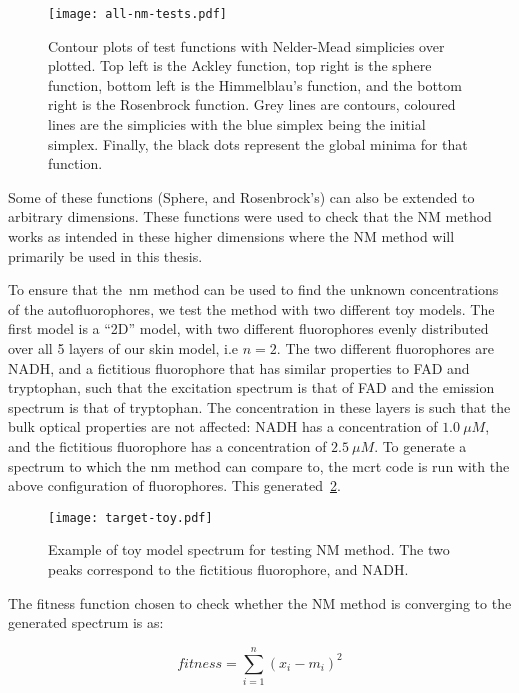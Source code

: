 \begin{figure}[!htbp]
    \centering
    \texttt{[image: all-nm-tests.pdf]}
    \caption{Contour plots of test functions with Nelder-Mead simplicies over plotted. Top left is the Ackley function, top right is the sphere function, bottom left is the Himmelblau's function, and the bottom right is the Rosenbrock function. Grey lines are contours, coloured lines are the simplicies with the blue simplex being the initial simplex. Finally, the black dots represent the global minima for that function.}
    \label{fig:nmtest}
\end{figure}

Some of these functions (Sphere, and Rosenbrock's) can also be extended to arbitrary dimensions. These functions were used to check that the NM method works as intended in these higher dimensions where the NM method will primarily be used in this thesis.

To ensure that the~\gls*{nm} method can be used to find the unknown concentrations of the autofluorophores, we test the method with two different toy models.
The first model is a ``2D'' model, with two different fluorophores evenly distributed over all 5 layers of our skin model, i.e $n=2$. 
The two different fluorophores are NADH, and a fictitious fluorophore that has similar properties to FAD and tryptophan, such that the excitation spectrum is that of FAD and the emission spectrum is that of tryptophan.
The concentration in these layers is such that the bulk optical properties are not affected: NADH has a concentration of $1.0~\mu M$, and the fictitious fluorophore has a concentration of $2.5~\mu M$.
To generate a spectrum to which the \gls*{nm} method can compare to, the \gls*{mcrt} code is run with the above configuration of fluorophores.
This generated~\cref{fig:toymodelspectra}.


\begin{figure}[!htbp]
  \centering
  \texttt{[image: target-toy.pdf]}
  \caption{Example of toy model spectrum for testing NM method. The two peaks correspond to the fictitious fluorophore, and NADH.}
  \label{fig:toymodelspectra}
\end{figure}

The fitness function chosen to check whether the NM method is converging to the generated spectrum is as:

\begin{equation}
fitness = \sum\limits_{i=1}^{n}(x_i-m_i)^2
\end{equation}

